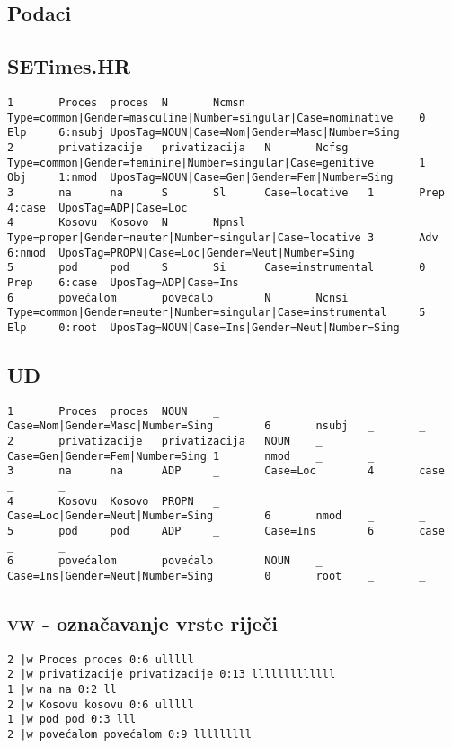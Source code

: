 \begin{appendix}
\chapter{Podaci}\label{appendix:data}
\section{SETimes.HR}
\begin{lstlisting}[basicstyle=\tiny\ttfamily]
1       Proces  proces  N       Ncmsn   Type=common|Gender=masculine|Number=singular|Case=nominative    0       Elp     6:nsubj UposTag=NOUN|Case=Nom|Gender=Masc|Number=Sing
2       privatizacije   privatizacija   N       Ncfsg   Type=common|Gender=feminine|Number=singular|Case=genitive       1       Obj     1:nmod  UposTag=NOUN|Case=Gen|Gender=Fem|Number=Sing
3       na      na      S       Sl      Case=locative   1       Prep    4:case  UposTag=ADP|Case=Loc
4       Kosovu  Kosovo  N       Npnsl   Type=proper|Gender=neuter|Number=singular|Case=locative 3       Adv     6:nmod  UposTag=PROPN|Case=Loc|Gender=Neut|Number=Sing
5       pod     pod     S       Si      Case=instrumental       0       Prep    6:case  UposTag=ADP|Case=Ins
6       povećalom       povećalo        N       Ncnsi   Type=common|Gender=neuter|Number=singular|Case=instrumental     5       Elp     0:root  UposTag=NOUN|Case=Ins|Gender=Neut|Number=Sing
\end{lstlisting}

\section{UD}
\begin{lstlisting}[basicstyle=\tiny\ttfamily]
1       Proces  proces  NOUN    _       Case=Nom|Gender=Masc|Number=Sing        6       nsubj   _       _
2       privatizacije   privatizacija   NOUN    _       Case=Gen|Gender=Fem|Number=Sing 1       nmod    _       _
3       na      na      ADP     _       Case=Loc        4       case    _       _
4       Kosovu  Kosovo  PROPN   _       Case=Loc|Gender=Neut|Number=Sing        6       nmod    _       _
5       pod     pod     ADP     _       Case=Ins        6       case    _       _
6       povećalom       povećalo        NOUN    _       Case=Ins|Gender=Neut|Number=Sing        0       root    _       _
\end{lstlisting}

\section{\textsc{vw} - označavanje vrste riječi}
\begin{lstlisting}[basicstyle=\tiny\ttfamily]
2 |w Proces proces 0:6 ulllll
2 |w privatizacije privatizacije 0:13 lllllllllllll
1 |w na na 0:2 ll
2 |w Kosovu kosovu 0:6 ulllll
1 |w pod pod 0:3 lll
2 |w povećalom povećalom 0:9 lllllllll
\end{lstlisting}

\end{appendix}
